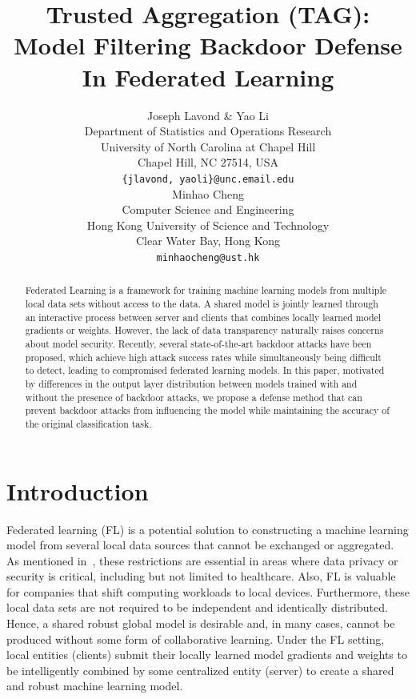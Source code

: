 \documentclass{article} %
\title{
    Trusted Aggregation (TAG): Model Filtering Backdoor Defense In Federated Learning
}
\author{%
    Joseph Lavond \& Yao Li  \\
    Department of Statistics and Operations Research \\
    University of North Carolina at Chapel Hill \\
    Chapel Hill, NC 27514, USA \\
    \texttt{\{jlavond, yaoli\}@unc.email.edu} \\
    \And
    Minhao Cheng \\
    Computer Science and Engineering \\
    Hong Kong University of Science and Technology \\
    Clear Water Bay, Hong Kong \\
    \texttt{minhaocheng@ust.hk}
}
\begin{document}
\maketitle

\begin{abstract}
Federated Learning is a framework for training machine learning models from multiple local data sets without access to the data. A shared model is jointly learned through an interactive process between server and clients that combines locally learned model gradients or weights. However, the lack of data transparency naturally raises concerns about model security. Recently, several state-of-the-art backdoor attacks have been proposed, which achieve high attack success rates while simultaneously being difficult to detect, leading to compromised federated learning models. In this paper, motivated by differences in the output layer distribution between models trained with and without the presence of backdoor attacks, we propose a defense method that can prevent backdoor attacks from influencing the model while maintaining the accuracy of the original classification task.
\end{abstract}

\section{Introduction}

Federated learning (FL) is a potential solution to constructing a machine learning model from several local data sources that cannot be exchanged or aggregated. As mentioned in~\cite{fed-learn}, these restrictions are essential in areas where data privacy or security is critical, including but not limited to healthcare.  Also, FL is valuable for companies that shift computing workloads to local devices. Furthermore, these local data sets are not required to be independent and identically distributed. Hence, a shared robust global model is desirable and, in many cases, cannot be produced without some form of collaborative learning.  Under the FL setting, local entities (clients) submit their locally learned model gradients and weights to be intelligently combined by some centralized entity (server) to create a shared and robust machine learning model.
\end{document}
